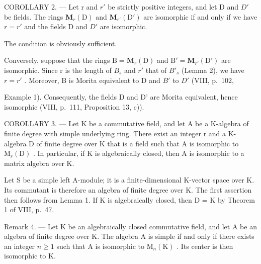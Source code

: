 COROLLARY 2. --- Let r and \(r'\) be strictly positive integers, and let D and \(D'\) be fields. The rings \(\mathbf{M}_{r}(\mathrm{D})\) and \(\mathbf{M}_{r'}(\mathrm{D}')\) are isomorphic if and only if we have \(r = r'\) and the fields D and \(D'\) are isomorphic.

The condition is obviously sufficient.

Conversely, suppose that the rings \(\mathrm{B} = \mathbf{M}_{r}(\mathrm{D})\) and \(\mathrm{B}' = \mathbf{M}_{r'}(\mathrm{D}')\) are isomorphic. Since r is the length of \(B_{s}\) and \(r'\) that of \(B'_{s}\) (Lemma 2), we have \(r = r'\) . Moreover, B is Morita equivalent to D and \(B'\) to \(D'\) (VIII, p.~102,

Example 1). Consequently, the fields D and D' are Morita equivalent, hence isomorphic (VIII, p.~111, Proposition 13, c)).

COROLLARY 3. --- Let K be a commutative field, and let A be a K-algebra of finite degree with simple underlying ring. There exist an integer r and a K-algebra D of finite degree over K that is a field such that A is isomorphic to \(\mathrm{M}_{r}(\mathrm{D})\) . In particular, if K is algebraically closed, then A is isomorphic to a matrix algebra over K.

Let S be a simple left A-module; it is a finite-dimensional K-vector space over K. Its commutant is therefore an algebra of finite degree over K. The first assertion then follows from Lemma 1. If K is algebraically closed, then D = K by Theorem 1 of VIII, p.~47.

Remark 4. --- Let K be an algebraically closed commutative field, and let A be an algebra of finite degree over K. The algebra A is simple if and only if there exists an integer \(n \geqslant 1\) such that A is isomorphic to \(\mathrm{M}_{n}(\mathrm{K})\) . Its center is then isomorphic to K.

